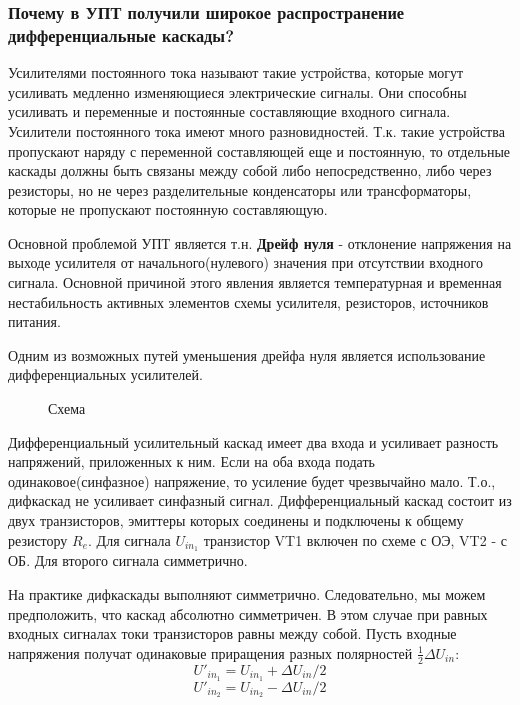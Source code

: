 \subsubsection{Почему в УПТ получили широкое распространение дифференциальные каскады?}

Усилителями постоянного тока называют такие устройства, которые могут усиливать медленно изменяющиеся электрические сигналы. Они способны усиливать и переменные и постоянные составляющие входного сигнала. Усилители постоянного тока имеют много разновидностей. Т.к. такие устройства пропускают наряду с переменной составляющей еще и постоянную, то отдельные каскады должны быть связаны между собой либо непосредственно, либо через резисторы, но не через разделительные конденсаторы или трансформаторы, которые не пропускают постоянную составляющую.

Основной проблемой УПТ является т.н. \textbf{Дрейф нуля} - отклонение напряжения на выходе усилителя от начального(нулевого) значения при отсутствии входного сигнала. Основной причиной этого явления является температурная и временная нестабильность активных элементов схемы усилителя, резисторов, источников питания.

Одним из возможных путей уменьшения дрейфа нуля является использование дифференциальных усилителей.

\begin{center}
	\begin{figure}[h!]
		\caption{Схема}
	\end{figure}
\end{center} 

Дифференциальный усилительный каскад имеет два входа и усиливает разность напряжений, приложенных к ним. Если на оба входа подать одинаковое(синфазное) напряжение, то усиление будет чрезвычайно мало. Т.о., дифкаскад не усиливает синфазный сигнал. Дифференциальный каскад состоит из двух транзисторов, эмиттеры которых соединены и подключены к общему резистору $R_e$. Для сигнала $U_{in_1}$ транзистор VT1 включен по схеме с ОЭ, VT2 - с ОБ. Для второго сигнала симметрично.

На практике дифкаскады выполняют симметрично. Следовательно, мы можем предположить, что каскад абсолютно симметричен. В этом случае при равных входных сигналах токи транзисторов равны между собой. Пусть входные напряжения получат одинаковые приращения разных полярностей $\frac{1}{2}\Delta U_{in}$:
$$
U'_{in_1} = U_{in_1} + \Delta U_{in}/2
$$
$$
U'_{in_2} = U_{in_2} - \Delta U_{in}/2
$$ 

